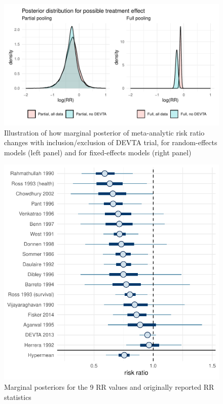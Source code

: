 \documentclass[12pt]{article}
\begin{document}
\begin{figure}[h!]
\includegraphics{baggr-density.pdf}
\caption{Illustration of how marginal posterior of meta-analytic risk ratio changes with inclusion/exclusion of DEVTA trial, for random-effects models (left panel) and for fixed-effects models (right panel)}
\label{baggr-density}
\end{figure}

\begin{figure}[h!]
\centering
\includegraphics{baggr-re.pdf}
\caption{Marginal posteriors for the 9 RR values and originally reported RR statistics} \label{baggr-re}
\end{figure}
\end{document}
